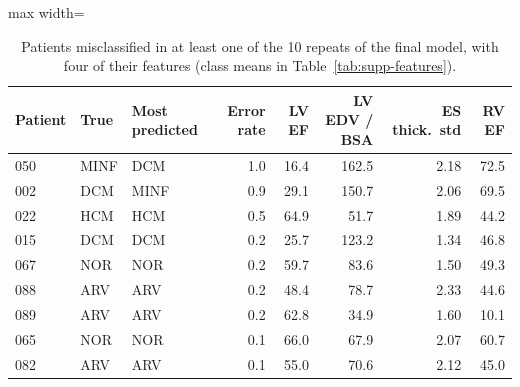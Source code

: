 \begin{table}[H]
\centering
\small
\setlength{\tabcolsep}{4pt}
\begin{adjustbox}{max width=\linewidth}
\begin{tabular}{lllrrrrr}
\toprule
Patient & True & Most predicted & Error rate & LV EF & LV EDV / BSA & ES thick.\ std & RV EF \\
\midrule
050 & MINF & DCM & 1.0 & 16.4 & 162.5 & 2.18 & 72.5 \\
002 & DCM & MINF & 0.9 & 29.1 & 150.7 & 2.06 & 69.5 \\
022 & HCM & HCM & 0.5 & 64.9 & 51.7 & 1.89 & 44.2 \\
015 & DCM & DCM & 0.2 & 25.7 & 123.2 & 1.34 & 46.8 \\
067 & NOR & NOR & 0.2 & 59.7 & 83.6 & 1.50 & 49.3 \\
088 & ARV & ARV & 0.2 & 48.4 & 78.7 & 2.33 & 44.6 \\
089 & ARV & ARV & 0.2 & 62.8 & 34.9 & 1.60 & 10.1 \\
065 & NOR & NOR & 0.1 & 66.0 & 67.9 & 2.07 & 60.7 \\
082 & ARV & ARV & 0.1 & 55.0 & 70.6 & 2.12 & 45.0 \\
\bottomrule
\end{tabular}
\end{adjustbox}
\caption{Patients misclassified in at least one of the 10 repeats of the final model, with four of their features (class means in Table~\ref{tab:supp-features}).}
\label{tab:supp-errors}
\end{table}

